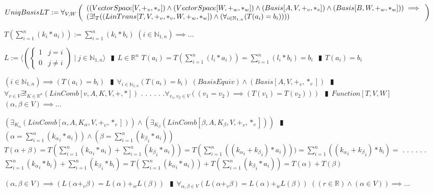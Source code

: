 \documentclass{book}
\newcommand{\abr}{:=}
\newcommand{\cont}{\phantom{.}. . .\phantom{.}}
\newcommand{\pipe}{$\phantom{(}\vrectangleblack\phantom{)}$}
\newcommand{\st}{\mathbin{|}}
\begin{document}
$UniqBasisLT \abr \forall_{V, W}\left(\begin{array}{ll}
  ((VectorSpace[V, +_v, *_v]) \land (VectorSpace[W, +_w, *_w]) \land (Basis[A, V, +_v, *_v]) \land (Basis[B, W, +_w, *_w])) \hfill \implies \hfill \\
  (\exists!_{T}((LinTrans[T, V, +_v, *_v, W, +_w, *_w]) \land (\forall_{i \in \mathbb{N}_{1, n}}(T(a_i) = b_i))))
\end{array}\right)$
\begin{enumerate}
  \lit $T(\sum_{i = 1}^{n}(k_i * a_i)) \abr \sum_{i = 1}^{n}(k_i * b_i)$
  \lit $(i \in \mathbb{N}_{1, n}) \implies \ldots$
  \begin{enumerate}
    \lit $L \abr \langle \left(\begin{cases} 
      1 & j = i \\
      0 & j \neq i 
    \end{cases}\right) \st j \in \mathbb{N}_{1, n} \rangle$ \pipe $L \in \mathbb{R}^n$
    \lit $T(a_i) = T(\sum_{i = 1}^{n}(l_i * a_i)) = \sum_{i = 1}^{n}(l_i * b_i) = b_i$ \pipe $T(a_i) = b_i$
  \end{enumerate}
  \lit $(i \in \mathbb{N}_{1, n}) \implies (T(a_i) = b_i)$ \pipe $\forall_{i \in \mathbb{N}_{1, n}}(T(a_i) = b_i)$
  \lit $(BasisEquiv) \land (Basis[A, V, +_v, *_v])$ \pipe $\forall_{v \in V} \exists!_{K \in \mathbb{R}^n}(LinComb[v, A, K, V, +, *])$ \cont
  \lit \cont $\forall_{v_1, v_2 \in V}((v_1 = v_2) \implies (T(v_1) = T(v_2)))$ \pipe $Function[T, V, W]$
  \lit $(\alpha, \beta \in V) \implies \ldots$
  \begin{enumerate}
    \lit $(\exists_{K_\alpha}(LinComb[\alpha, A, K_\alpha, V, +_v, *_v])) \land (\exists_{K_\beta}(LinComb[\beta, A, K_\beta, V, +_v, *_v]))$ \pipe $(\alpha = \sum_{i = 1}^{n}({k_\alpha}_i * a_i)) \land (\beta = \sum_{i = 1}^{n}({k_\beta}_i * a_i))$
    \lit $T(\alpha + \beta) = T(\sum_{i = 1}^{n}({k_\alpha}_i * a_i) + \sum_{i = 1}^{n}({k_\beta}_i * a_i)) = T(\sum_{i = 1}^{n}(({k_\alpha}_i + {k_\beta}_i) * a_i))) = \sum_{i = 1}^{n}(({k_\alpha}_i + {k_\beta}_i) * b_i) = $ \cont
    \lit \cont $\sum_{i = 1}^{n}({k_\alpha}_i * b_i) + \sum_{i = 1}^{n}({k_\beta}_i * b_i) = T(\sum_{i = 1}^{n}({k_\alpha}_i * a_i)) + T(\sum_{i = 1}^{n}({k_\beta}_i * a_i)) = T(\alpha) + T(\beta)$
  \end{enumerate}
  \lit $(\alpha, \beta \in V) \implies (L(\alpha +_v \beta) = L(\alpha) +_w L(\beta))$ \pipe $\forall_{\alpha, \beta \in V}(L(\alpha +_v \beta) = L(\alpha) +_w L(\beta))$
  \lit $((r \in \mathbb{R}) \land (\alpha \in V)) \implies \ldots$

\end{enumerate}
\end{document}
